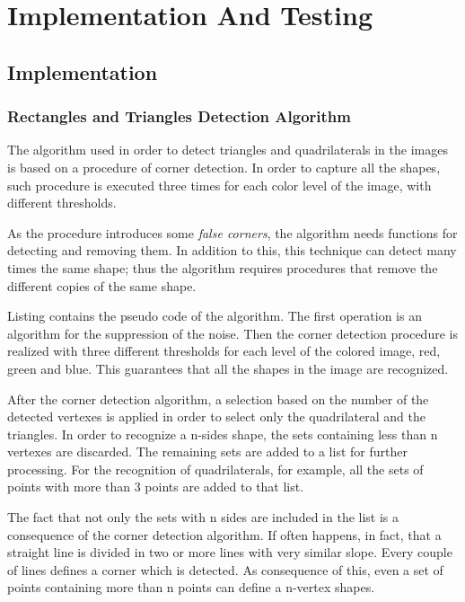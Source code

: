 \chapter{Implementation And Testing}\label{impl_test}
	
	\section{Implementation}
	
		\subsection{Rectangles and Triangles Detection Algorithm}
		The algorithm used in order to detect triangles and quadrilaterals in the images is based on a procedure of corner detection. 
		In order to capture all the shapes, such procedure is executed three times for each color level of the image, with different thresholds.

		As the procedure introduces some \emph{false corners}, the algorithm needs functions for detecting and removing them. 
		In addition to this, this technique can detect many times the same shape; thus  the algorithm requires procedures that remove the different copies of the same shape.
		
		Listing \todo{} contains the pseudo code of the algorithm.
		The first operation is an algorithm for the suppression of the noise.
		Then the corner detection procedure is realized with three different thresholds for each level of the colored image, red, green and blue.
		This guarantees that all the shapes in the image are recognized.
		
		After the corner detection algorithm, a selection based on the number of the detected vertexes is applied in order to select only the quadrilateral and the triangles.
		In order to recognize a n-sides shape, the sets containing less than n vertexes are discarded. The remaining sets are added to a list for further processing.
		For the recognition of quadrilaterals, for example, all the sets of points with more than 3 points are added to that list.
		
		The fact that not only the sets with n sides are included in the list is a consequence of the corner detection algorithm. 
		If often happens, in fact, that a straight line is divided in two or more lines with very similar slope. Every couple of lines defines a corner which is detected. As consequence of this, even a set of points containing more than n points can define a n-vertex shapes. 
		
